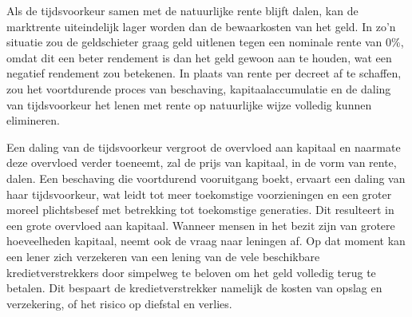 Als de tijdsvoorkeur samen met de natuurlijke rente blijft dalen, kan de marktrente uiteindelijk lager worden dan de bewaarkosten van het geld. In zo'n situatie zou de geldschieter graag geld uitlenen tegen een nominale rente van 0\%, omdat dit een beter rendement is dan het geld gewoon aan te houden, wat een negatief rendement zou betekenen. In plaats van rente per decreet af te schaffen, zou het voortdurende proces van beschaving, kapitaalaccumulatie en de daling van tijdsvoorkeur het lenen met rente op natuurlijke wijze volledig kunnen elimineren.

Een daling van de tijdsvoorkeur vergroot de overvloed aan kapitaal en naarmate deze overvloed verder toeneemt, zal de prijs van kapitaal, in de vorm van rente, dalen. Een beschaving die voortdurend vooruitgang boekt, ervaart een daling van haar tijdsvoorkeur, wat leidt tot meer toekomstige voorzieningen en een groter moreel plichtsbesef met betrekking tot toekomstige generaties. Dit resulteert in een grote overvloed aan kapitaal. Wanneer mensen in het bezit zijn van grotere hoeveelheden kapitaal, neemt ook de vraag naar leningen af. Op dat moment kan een lener zich verzekeren van een lening van de vele beschikbare kredietverstrekkers door simpelweg te beloven om het geld volledig terug te betalen. Dit bespaart de kredietverstrekker namelijk de kosten van opslag en verzekering, of het risico op diefstal en verlies.

